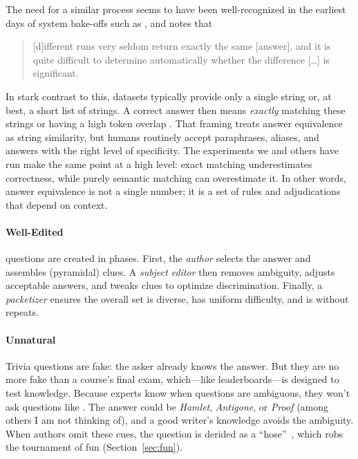 The need for a similar process seems to have been well-recognized
in the earliest days of \qa{} system bake-offs such as , and \citet{voorhees-08} notes that
\begin{quote}
    [d]ifferent  runs very seldom return exactly the same [answer], and it is quite difficult to determine automatically whether the difference [\dots] is significant.
\end{quote} 
In stark contrast to this, \qa{} datasets typically provide only a single
string or, at best, a short list of strings. A correct answer then means
\emph{exactly} matching these strings or having a high token overlap
\fone{}. That framing treats answer equivalence as string similarity, but
humans routinely accept paraphrases, aliases, and answers with the right level
of specificity. The experiments we and others have run make the same point at a
high level: exact matching underestimates correctness, while purely semantic
matching can overestimate it. In other words, answer equivalence is not a
single number; it is a set of rules and adjudications that depend on context.

\paragraph{Well-Edited}

\qb{} questions are created in phases. First, the \emph{author} selects the
answer and assembles (pyramidal) clues. A \emph{subject editor} then removes
ambiguity, adjusts acceptable answers, and tweaks clues to optimize
discrimination. Finally, a \emph{packetizer} ensures the overall set is
diverse, has uniform difficulty, and is without repeats.

\paragraph{Unnatural}
\label{sec:manchester:unnatural}

Trivia questions are fake: the asker already knows the answer.
 But they are no
more fake than a course's final exam, which---like leaderboards---is designed
to test knowledge.
%
Because experts know when questions are ambiguous, they won't ask
questions like .
The answer could be \textit{Hamlet}, \textit{Antigone}, or
\textit{Proof} (among others I am not thinking of), and a good
writer's knowledge avoids the ambiguity.
%
When authors
omit these cues, the question is derided as a ``hose''~\citep{2013-eltinge},
which robs the tournament of fun (Section~\ref{sec:fun}).

